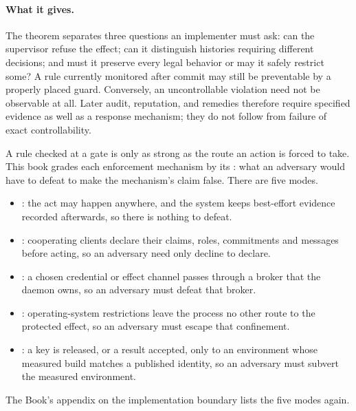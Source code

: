 \documentclass[11pt,a4paper]{article}
\theoremstyle{definition}
\theoremstyle{remark}
\begin{document}

\FloatBarrier

\paragraph{What it gives.}
The theorem separates three questions an implementer must ask: can the
supervisor refuse the effect; can it distinguish histories requiring different
decisions; and must it preserve every legal behavior or may it safely restrict
some? A rule currently monitored after commit may still be preventable by a
properly placed guard. Conversely, an uncontrollable violation need not be
observable at all. Later audit, reputation, and remedies therefore require
specified evidence as well as a response mechanism; they do not follow from
failure of exact controllability.

A rule checked at a gate is only as strong as the route an action is forced
to take. This book grades each enforcement mechanism by its
: what an adversary would have to defeat to make the
mechanism's claim false. There are five modes.
\begin{itemize}[leftmargin=1.4em,itemsep=1pt]
  \item {}: the act may happen anywhere, and the system keeps
  best-effort evidence recorded afterwards, so there is nothing to defeat.
  \item {}: cooperating clients declare their claims, roles,
  commitments and messages before acting, so an adversary need only decline to
  declare.
  \item {}: a chosen credential or effect channel passes through
  a broker that the daemon owns, so an adversary must defeat that broker.
  \item {}: operating-system restrictions leave the process no
  other route to the protected effect, so an adversary must escape that
  confinement.
  \item {}: a key is released, or a result accepted, only to an
  environment whose measured build matches a published identity, so an
  adversary must subvert the measured environment.
\end{itemize}
\ifpdbook The Book's appendix on the implementation boundary lists the five
modes again.\fi
\end{document}
